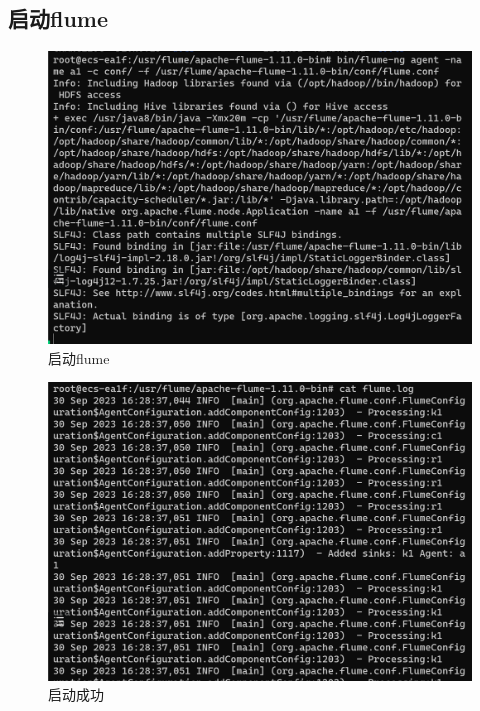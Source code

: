 \subsection{启动flume}
\begin{figure}[H]
  \centering
  \includegraphics[width=\textwidth]{figure/启动flume.png}
  \caption{启动flume}
  \label{fig:my_label}
\end{figure}
\begin{figure}[H]
  \centering
  \includegraphics[width=\textwidth]{figure/启动成功.png}
  \caption{启动成功}
  \label{fig:my_label}
\end{figure}

